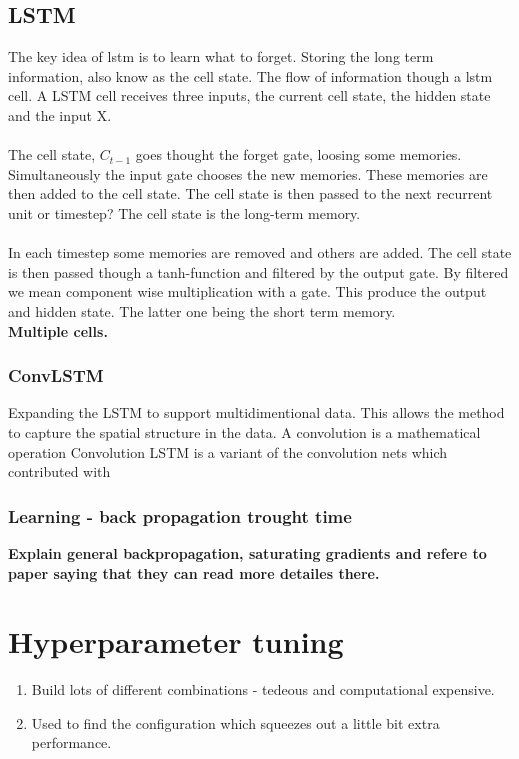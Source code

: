 \subsection{LSTM}

The key idea of \acrfull{lstm} is to learn what to forget. Storing the long term information, also know as the cell state. The flow of information though a \acrshort{lstm} cell. A \acrshort{LSTM} cell receives three inputs, the current cell state, the hidden state and the input X. 
\\ \\
The cell state, $C_{t-1}$ goes thought the forget gate, loosing some memories. Simultaneously the input gate chooses the new memories.  These memories are then added to the cell state. The cell state is then passed to the next recurrent unit or timestep? The cell state is the long-term memory.
\\ \\
In each timestep some memories are removed and others are added. The cell state is then passed though a tanh-function and filtered by the output gate. By filtered we mean component wise multiplication with a gate. This produce the output and hidden state. The latter one being the short term memory.
\\ 
\textbf{Multiple cells.}

\subsubsection{ConvLSTM}
Expanding the LSTM to support multidimentional data. This allows the method to capture the spatial structure in the data. A convolution is a mathematical operation 
Convolution LSTM is a variant of the convolution nets which contributed with 

\subsubsection{Learning - back propagation trought time}
\textbf{Explain general backpropagation, saturating gradients and refere to paper saying that they can read more detailes there.}

\section{Hyperparameter tuning}
\begin{enumerate}
    \item Build lots of different combinations - tedeous and computational expensive. 
    \item Used to find the configuration which squeezes out a little bit extra performance.
\end{enumerate}




